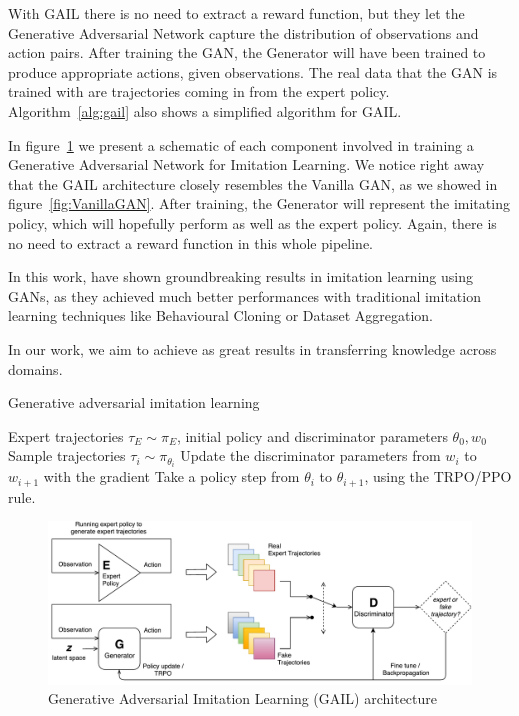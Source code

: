 With GAIL there is no need to extract a reward function, but they let the Generative Adversarial Network capture the distribution of observations and action pairs. After training the GAN, the Generator will have been trained to produce appropriate actions, given observations. The real data that the GAN is trained with are trajectories coming in from the expert policy. Algorithm~\ref{alg:gail} also shows a simplified algorithm for GAIL.

In figure~\ref{fig:GAIL-GAN} we present a schematic of each component involved in training a Generative Adversarial Network for Imitation Learning. We notice right away that the GAIL architecture closely resembles the Vanilla GAN, as we showed in figure~\ref{fig:VanillaGAN}. After training, the Generator will represent the imitating policy, which will hopefully perform as well as the expert policy. Again, there is no need to extract a reward function in this whole pipeline.

In this work, \citeauthor{ho2016generative} have shown groundbreaking results in imitation learning using GANs, as they achieved much better performances with traditional imitation learning techniques like Behavioural Cloning or Dataset Aggregation.

In our work, we aim to achieve as great results in transferring knowledge across domains.

\begin{algorithm}[tb]
    \caption{Generative adversarial imitation learning}
    \label{alg:gail}
    \begin{algorithmic}[1]
        Expert trajectories $\tau_E \sim \pi_E$, initial policy and discriminator parameters $\theta_0, w_0$
           \STATE Sample trajectories $\tau_i \sim \pi_{\theta_i}$
           \STATE Update the discriminator parameters from $w_i$ to $w_{i+1}$ with the gradient
           \STATE Take a policy step from $\theta_i$ to $\theta_{i+1}$, using the TRPO/PPO rule.
       \ENDFOR
    \end{algorithmic}
\end{algorithm}

\begin{figure}
\centering
\includegraphics[width=15cm]{Figures/GAIL-GAN}
\caption{Generative Adversarial Imitation Learning (GAIL) architecture}
\label{fig:GAIL-GAN}
\end{figure}


